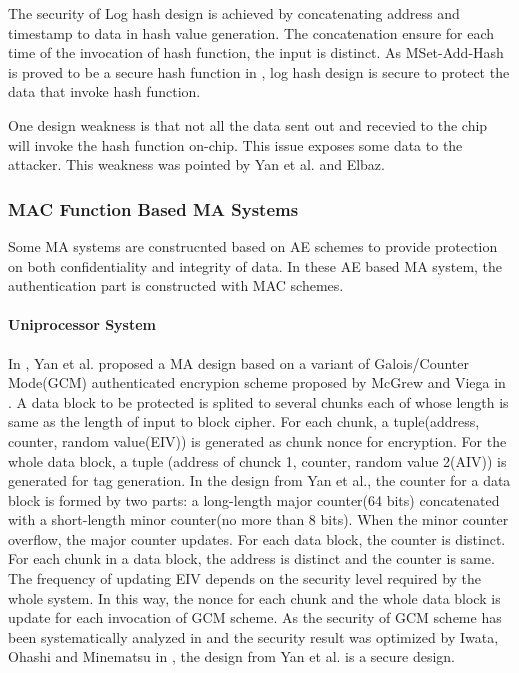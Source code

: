 \documentclass{article}
\begin{document}
The security of Log hash design is achieved by concatenating address and timestamp to data in hash value generation. The concatenation ensure for each time of the invocation of hash function, the input is distinct.
As MSet-Add-Hash is proved to be a secure hash function in \cite{keylist}, log hash design is secure to protect the data that invoke hash function.

One design weakness is that not all the data sent out and recevied to the chip will invoke the hash function on-chip. This issue exposes some data to the attacker. This weakness was pointed by Yan et al.\cite{keylist} and Elbaz\cite{keylist}. 

\subsubsection{MAC Function Based MA Systems}
Some MA systems are construcnted based on AE schemes to provide protection on both confidentiality and integrity of data. In these AE based MA system, the authentication part is constructed with MAC schemes.
\paragraph{Uniprocessor System}
In \cite{keylist}, Yan et al. proposed a MA design based on a variant of Galois/Counter Mode(GCM) authenticated encrypion scheme proposed by McGrew and Viega in \cite{keylist}. A data block to be protected is splited to several chunks each of whose length is same as the length of input to block cipher. For each chunk, a tuple(address, counter, random value(EIV)) is generated as chunk nonce for encryption. For the whole data block, a tuple (address of chunck 1, counter, random value 2(AIV)) is generated for tag generation. 
In the design from Yan et al., the counter for a data block is formed by two parts: a long-length major counter(64 bits) concatenated with a short-length minor counter(no more than 8 bits). When the minor counter overflow, the major counter updates. For each data block, the counter is distinct. For each chunk in a data block, the address is distinct and the counter is same. The frequency of updating EIV depends on the security level required by the whole system.  In this way, the nonce for each chunk and the whole data block is update for each invocation of GCM scheme. As the security of GCM scheme has been systematically analyzed in \cite{keylist} and the security result was optimized by Iwata, Ohashi and Minematsu in \cite{keylist}, the design from Yan et al. is a secure design.
\end{document}
